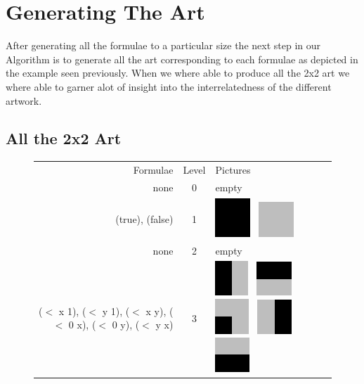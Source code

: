 \documentclass[11pt]{article}
\begin{document}
\section{Generating The Art}{

After generating all the formulae to a particular size the next step in our Algorithm is
to generate all the art corresponding to each formulae as depicted in the example seen
previously. When we where able to produce all the 2x2 art we where able to garner alot of
insight into the interrelatedness of the different artwork.

\subsection{All the 2x2 Art}
\begin{figure}
\begin{center}
\begin{tabular}{r c l}
Formulae & Level & Pictures \\
\tiny{none} & 0 & empty \\
\tiny{(true), (false)} & 1 &
    \includegraphics[width=.25in]{../presentation/2x2/Shape1LVL1.png}~
    \includegraphics[width=.25in]{../presentation/2x2/Shape2LVL1.png} \\
\tiny{none} & 2 & empty \\
\tiny{($<$ x 1), ($<$ y 1), ($<$ x y), ($<$ 0 x), ($<$ 0 y), ($<$ y x)} & 3 & 
    \includegraphics[width=.25in]{../presentation/2x2/Shape1LVL3.png}~
    \includegraphics[width=.25in]{../presentation/2x2/Shape2LVL3.png}~
    \includegraphics[width=.25in]{../presentation/2x2/Shape5LVL3.png}~
    \includegraphics[width=.25in]{../presentation/2x2/Shape6LVL3.png}~
    \includegraphics[width=.25in]{../presentation/2x2/Shape3LVL3.png}~

\end{tabular}
\end{center}
\end{figure}}
\end{document}
